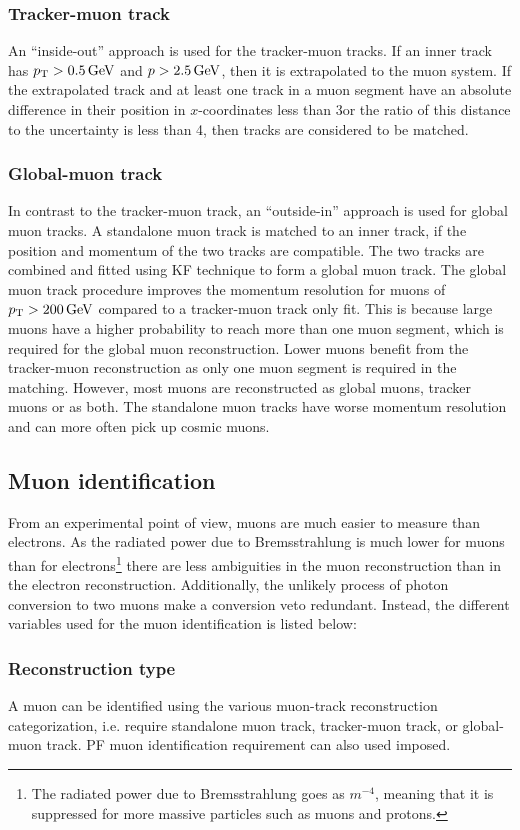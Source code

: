 \subsubsection*{Tracker-muon track}
\noindent\justify
An ``inside-out'' approach is used for the tracker-muon tracks. 
If an inner track has $p_{\mathrm{T}} > 0.5\,\text{Ge\hspace{-.08em}V}$ and $p > 2.5\,\text{Ge\hspace{-.08em}V}$, then it is extrapolated to the muon system. 
If the extrapolated track and at least one track in a muon segment have an absolute difference in their position in $x$-coordinates less than 3\cm or the ratio of this distance to the uncertainty is less than 4, then tracks are considered to be matched.  
\subsubsection*{Global-muon track}
\noindent\justify
In contrast to the tracker-muon track, an ``outside-in'' approach is used for global muon tracks. 
A standalone muon track is matched to an inner track, if the position and momentum of the two tracks are compatible. 
The two tracks are combined and fitted using KF technique to form a global muon track. 
The global muon track procedure improves the momentum resolution for muons of $p_{\mathrm{T}} > 200\,\text{Ge\hspace{-.08em}V}$ compared to a tracker-muon track only fit. 
This is because large \pt muons have a higher probability to reach more than one muon segment, which is required for the global muon reconstruction. 
Lower \pt muons benefit from the tracker-muon reconstruction as only one muon segment is required in the matching. 
However, most muons are reconstructed as global muons, tracker muons or as both. The standalone muon tracks have worse momentum resolution and can more often pick up cosmic muons. 
\subsection*{Muon identification}
\noindent\justify
From an experimental point of view, muons are much easier to measure than electrons. 
As the radiated power due to Bremsstrahlung is much lower for muons than for electrons\footnote{The radiated power due to Bremsstrahlung goes as $m^{-4}$, meaning that it is suppressed for more massive particles such as muons and protons.} there are less ambiguities in the muon reconstruction than in the electron reconstruction. 
Additionally, the unlikely process of photon conversion to two muons make a conversion veto redundant.   
Instead, the different variables used for the muon identification is listed below:
\subsubsection*{Reconstruction type}
\noindent\justify
 A muon can be identified using the various muon-track reconstruction categorization, i.e. require standalone muon track, tracker-muon track, or global-muon track. 
PF muon identification requirement can also used imposed.
